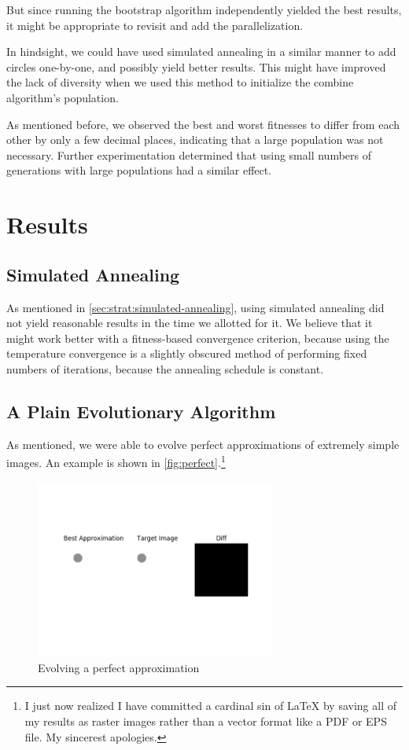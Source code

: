 \documentclass{article}
\begin{document}
But since running the bootstrap algorithm independently yielded the best results, it might be appropriate to revisit and add the parallelization.

In hindsight, we could have used simulated annealing in a similar manner to add circles one-by-one, and possibly yield better results. This might have improved the lack of diversity when we used this method to initialize the combine algorithm's population.

As mentioned before, we observed the best and worst fitnesses to differ from each other by only a few decimal places, indicating that a large population was not necessary. Further experimentation determined that using small numbers of generations with large populations had a similar effect.

\section{Results}\label{sec:results}
\subsection{Simulated Annealing}\label{sec:results:simulated-annealing}
As mentioned in \autoref{sec:strat:simulated-annealing}, using simulated annealing did not yield reasonable results in the time we allotted for it. We believe that it might work better with a fitness-based convergence criterion, because using the temperature convergence is a slightly obscured method of performing fixed numbers of iterations, because the annealing schedule is constant.
\subsection{A Plain Evolutionary Algorithm}\label{sec:results:evolutionary-algorithm}
As mentioned, we were able to evolve perfect approximations of extremely simple images. An example is shown in \autoref{fig:perfect}.\footnote{I just now realized I have committed a cardinal sin of \LaTeX{} by saving all of my results as raster images rather than a vector format like a PDF or EPS file. My sincerest apologies.}

\begin{figure}[H]
    \centering
    \includegraphics[width=0.7\textwidth]{output/evolve_perfect.png}
    \caption{Evolving a perfect approximation}\label{fig:perfect}
\end{figure}
\end{document}
